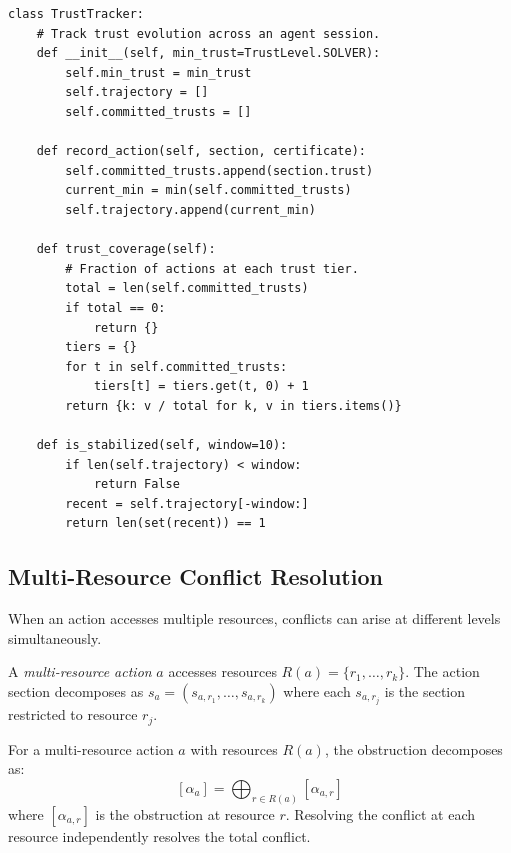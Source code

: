 \documentclass[11pt]{article}
\begin{document}
\begin{lstlisting}[style=jugeo-python,caption={Trust evolution tracking across sessions.}]
class TrustTracker:
    # Track trust evolution across an agent session.
    def __init__(self, min_trust=TrustLevel.SOLVER):
        self.min_trust = min_trust
        self.trajectory = []
        self.committed_trusts = []

    def record_action(self, section, certificate):
        self.committed_trusts.append(section.trust)
        current_min = min(self.committed_trusts)
        self.trajectory.append(current_min)

    def trust_coverage(self):
        # Fraction of actions at each trust tier.
        total = len(self.committed_trusts)
        if total == 0:
            return {}
        tiers = {}
        for t in self.committed_trusts:
            tiers[t] = tiers.get(t, 0) + 1
        return {k: v / total for k, v in tiers.items()}

    def is_stabilized(self, window=10):
        if len(self.trajectory) < window:
            return False
        recent = self.trajectory[-window:]
        return len(set(recent)) == 1
\end{lstlisting}

\subsection{Multi-Resource Conflict Resolution}\label{subsec:multi-resource}

When an action accesses multiple resources, conflicts can arise at
different levels simultaneously.

\begin{definition}\label{def:multi-resource}
A \emph{multi-resource action} $a$ accesses resources
$R(a) = \{r_1, \ldots, r_k\}$.  The action section decomposes as
$s_a = (s_{a,r_1}, \ldots, s_{a,r_k})$ where each $s_{a,r_j}$
is the section restricted to resource $r_j$.
\end{definition}

\begin{theorem}\label{thm:multi-conflict}
For a multi-resource action $a$ with resources $R(a)$, the
obstruction decomposes as:
\[
  [\alpha_a] = \bigoplus_{r \in R(a)} [\alpha_{a,r}]
\]
where $[\alpha_{a,r}]$ is the obstruction at resource $r$.
Resolving the conflict at each resource independently resolves the
total conflict.
\end{theorem}
\end{document}
